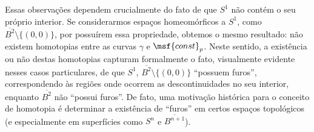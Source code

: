 Essas observações dependem crucialmente do fato de que $S^1$ não contém o seu próprio interior. Se considerarmos espaços homeomórficos a $S^1$, como $\overline{B^2} \setminus \{ (0, 0) \}$, por possuírem essa propriedade, obtemos o mesmo resultado: não existem homotopias entre as curvas $\gamma$ e $\msf{const}_p$. Neste sentido, a existência ou não destas homotopias capturam formalmente o fato, visualmente evidente nesses casos particulares, de que $S^1$, $\overline{B^2} \setminus \{ (0, 0) \}$ ``possuem furos'', correspondendo às regiões onde ocorrem as descontinuidades no seu interior, enquanto $\overline{B^2}$ não ``possui furos''. De fato, uma motivação histórica para o conceito de homotopia é determinar a existência de ``furos'' em certos espaços topológicos (e especialmente em superfícies como $S^n$ e $\overline{B^{n + 1}}$).%
\linebreak\vspace{-1.2em}